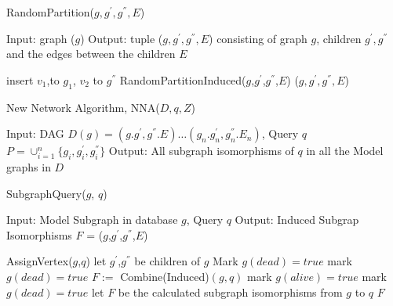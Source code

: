 \begin{algorithm}
\caption{RandomPartition($g,g^{'} ,g^{''} ,E$)}
\label{alg:alg104}
\begin{algorithmic}
\STATE Input: graph ($g$)
\STATE Output: tuple ($g,g^',g^{''},E$) consisting of graph $g$, children  $g^',g^{''} $ and the edges between the children $E$ 
\end{algorithmic}
\begin{algorithmic}[1]
    \STATE insert $v_1$,to $g_1$, $v_2$ to $g^{''}$    
 \ELSE
   RandomPartitionInduced($g$,$g^'$,$g^{''}$,$E$)
\ENDIF
\RETURN ($g ,g^{'} ,g^{''} ,E$)
\end{algorithmic}
\end{algorithm}


\begin{algorithm}
\caption{New Network Algorithm, NNA($D , q , Z$)}
\label{alg:alg105}
\begin{algorithmic}
\STATE Input: DAG $D(g)={(g.g^{'},g^{''} .E)\dots (g_n .g_n^{'},g_{n}^{''} .E_n )}$, Query $q$
\STATE $P = \cup_{i=1}^n \{g_i ,g_i^{'},g_i^{''} \}$ 
\STATE Output: All subgraph isomorphisms of $q$ in all the Model graphs in $D$
\end{algorithmic}
\begin{algorithmic}[1]
\STATE $F=\emptyset$
\STATE $Z=\emptyset$
  \STATE mark $S$ \textit$unsolved$}
\ENDFOR
\FOR{ each $S_i$ \IN $D$} do
   \STATE $F$=SubgraphQuery($S_i$,$q$)
    \IF{$F\neq \zero$}
            $Z$=$Z$ \cup $\{F\}$
     \ENDIF
\ENDFOR
\RETURN Z
\end{algorithmic}
\end{algorithm}


\begin{algorithm}
\caption{SubgraphQuery($g$, $q$)}
\label{alg:alg105}
\begin{algorithmic}
\STATE Input: Model Subgraph in database  $g$, Query $q$
\STATE Output: Induced Subgrap Isomorphisms $F$ = ($g$,$g^'$,$g^{''}$,$E$)
\end{algorithmic}
\begin{algorithmic}[1]
        \STATE AssignVertex($g$,$q$)
      \ELSE 
         \STATE let $g^'$,$g^{''}$ be children of $g$
          \STATE Mark $g(dead)=true$
			\STATE mark $g(dead)=true$
		\ELSE
			\STATE $F :=$ Combine(Induced)$(g,q)$
		\ENDIF
	\ENDIF
		\STATE mark $g(alive)=true$
	\ELSE
		\STATE mark  $g(dead)=true$
	\ENDIF
\ELSE
	\STATE let $F$ be the calculated subgraph isomorphisms from $g$ to $q$
\ENDIF
\RETURN $F$
          
\end{algorithmic}
\end{algorithm}



